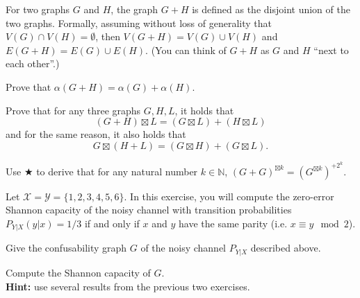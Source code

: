\documentclass[a4paper,10pt,landscape,twocolumn]{scrartcl}
\begin{document}
\begin{exercise}
For two graphs $G$ and $H$, the graph $G + H$ is defined as the disjoint union of the two graphs. Formally, assuming without loss of generality that $V(G) \cap V(H) = \emptyset$, then $V(G + H) = V(G) \cup V(H)$ and $E(G+H) = E(G) \cup E(H)$. (You can think of $G + H$ as $G$ and $H$ ``next to each other''.)
	\begin{subex}[(2pt)]
	Prove that $\alpha(G+H) = \alpha(G) + \alpha(H)$.
	\end{subex}
	\begin{subex**}
	Prove that for any three graphs $G,H,L$, it holds that
	\[
	(G+H) \boxtimes L = (G \boxtimes L) + (H \boxtimes L)
	\]
	and for the same reason, it also holds that
	\[
	G \boxtimes (H + L) = (G \boxtimes H) + (G \boxtimes L).
	\]
	\end{subex**}
	\begin{subex}[(3pt)]
	Use $\bigstar$ to derive that for any natural number $k \in \mathbb{N}$, $(G + G)^{\boxtimes k} = (G^{\boxtimes k})^{+2^k}$.
	\end{subex}
\end{exercise}

\begin{exercise}
Let $\mathcal{X} = \mathcal{Y} = \{1,2,3,4,5,6\}$. In this exercise, you will compute the zero-error Shannon capacity of the noisy channel with transition probabilities $P_{Y|X}(y|x) = 1/3$ if and only if $x$ and $y$ have the same parity (i.e. $x \equiv y \mod 2$).
	\begin{subex}[(2pt)]
	Give the confusability graph $G$ of the noisy channel $P_{Y|X}$ described above.
	\end{subex}
	\begin{subex}[(4pt)]
	Compute the Shannon capacity of $G$.
	\\\textbf{Hint:} use several results from the previous two exercises.
	\end{subex}
\end{exercise}
\end{document}
